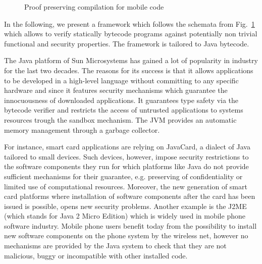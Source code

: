  

    \begin{figure}[ht!]
\begin{center}
\caption{\sc Proof preserving compilation for mobile code}
\label{intro:PPO}
\end{center}
\end{figure}


In the following, we present a framework which follows the schemata from Fig.\ \ref{intro:PPO}  which allows to verify statically bytecode programs 
against potentially non trivial functional and security properties. The framework is tailored to Java bytecode.

  The Java platform  of Sun Microsystems has gained a lot of popularity in industry   for the last two decades.
 The reasons for its  success is that it allows applications to 
 be developed in a high-level language without committing to any
 specific hardware and since it features security mechanisms which
 guarantee the innocuousness of downloaded applications. It guarantees type safety 
 via the bytecode verifier and   restricts the
 access  of untrusted applications to systems resources trough the sandbox mechanism.
 The JVM provides an automatic memory management through a garbage collector.  

 For instance, smart card applications are relying  on JavaCard, a dialect of Java tailored to small devices.
 Such devices, however, impose  security restrictions  to the software components  they run for which platforms like Java do not provide 
 sufficient mechanisms for their guarantee, e.g. preserving of confidentiality or limited use of computational resources. Moreover,
 the new generation of smart card platforms where installation of  software components after the card has been issued is possible, opens new security problems.
 Another example is the J2ME (which stands for Java 2 Micro Edition) which is widely used in mobile phone software industry.
 Mobile phone users benefit today from the possibility to install new software components on the phone system by the wireless net, 
 however no mechanisms are provided by the Java system to check that they are not malicious, buggy or incompatible with other installed
code.


